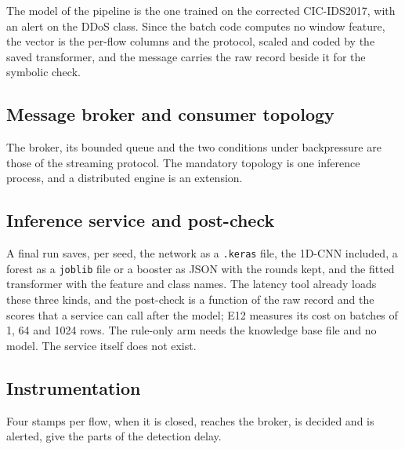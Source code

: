 The model of the pipeline is the one trained on the corrected CIC-IDS2017, with an alert on the
DDoS class. Since the batch code computes no window feature, the vector is the per-flow columns
and the protocol, scaled and coded by the saved transformer, and the message carries the raw
record beside it for the symbolic check.

\subsection{Message broker and consumer topology}
\label{sec:impl-broker}

The broker, its bounded queue and the two conditions under backpressure are those of
the streaming protocol. The mandatory topology is one inference process, and a
distributed engine is an extension.

\subsection{Inference service and post-check}
\label{sec:impl-service}

A final run saves, per seed, the network as a \texttt{.keras} file, the 1D-CNN included, a
forest as a \texttt{joblib} file or a booster as JSON with the rounds kept, and the fitted
transformer with the feature and class names. The latency tool already loads these three kinds,
and the post-check is a function of the raw record and the scores that a service can call after
the model; E12 measures its cost on batches of 1, 64 and 1024 rows. The rule-only arm needs the
knowledge base file and no model. The service itself does not exist.

\subsection{Instrumentation}
\label{sec:impl-instrumentation}

Four stamps per flow, when it is closed, reaches the broker, is decided and is alerted, give the
parts of the detection delay.


